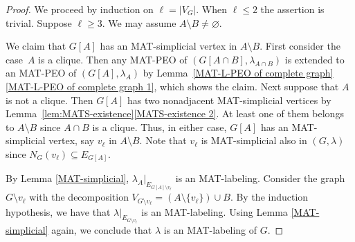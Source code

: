 \begin{proof}
We proceed by induction on $ \ell = |V_{G}| $.
When $ \ell \leq 2 $ the assertion is trivial. 
Suppose $ \ell \geq 3 $. 
We may assume $ A \setminus  B \neq \varnothing $. 

We claim that $ G[A] $ has an MAT-simplicial vertex in $ A \setminus B $. 
First consider the case~$ A $ is a clique. 
Then any MAT-PEO of $ (G[A\cap B], \lambda_{A\cap B}) $ is extended to an MAT-PEO of $ (G[A], \lambda_{A}) $ by Lemma~\ref{MAT-L-PEO of complete graph}\ref{MAT-L-PEO of complete graph 1}, which shows the claim. 
Next suppose that $ A $ is not a clique. 
Then $ G[A] $ has two nonadjacent MAT-simplicial vertices by Lemma~\ref{lem:MATS-existence}\ref{MATS-existence 2}. 
At least one of them belongs to $ A \setminus B $ since $ A \cap B $ is a clique. 
Thus, in either case, $ G[A] $ has an MAT-simplicial vertex, say  $ v_{\ell} $ in $A \setminus B$.
Note that $ v_{\ell} $ is MAT-simplicial also in $ (G, \lambda) $ since $ N_{G}(v_{\ell}) \subseteq E_{G[A]} $. 

By Lemma \ref{MAT-simplicial}, $ \lambda_A|_{E_{G[A]\setminus v_{\ell}}} $ is an MAT-labeling. 
Consider the graph $ G\setminus v_{\ell} $ with the decomposition $ V_{G\setminus v_{\ell}} = (A\setminus \{v_{\ell}\}) \cup B $. 
By the induction hypothesis, we have that $ \lambda|_{E_{G \setminus v_{\ell}}} $ is an MAT-labeling. 
Using Lemma \ref{MAT-simplicial} again, we conclude that $ \lambda $ is an MAT-labeling of $G$. 
\end{proof}

